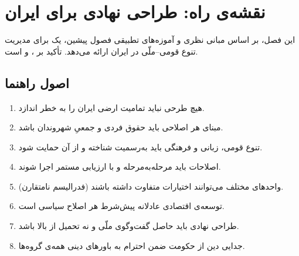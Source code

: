 
\chapter{نقشه‌ی راه: طراحی نهادی برای ایران}

\begin{keybox}
این فصل، بر اساس مبانی نظری و آموزه‌های تطبیقی فصول پیشین، یک  برای
مدیریت تنوع قومی–ملّی در ایران ارائه می‌دهد. تأکید بر ، 
و  است.
\end{keybox}

\section{اصول راهنما}

\begin{goldbox}
\begin{enumerate}[label=\textcolor{AccentGold}{\bfseries\Roman*.}]
  \item {}
    هیچ طرحی نباید تمامیت ارضی ایران را به خطر اندازد.
  \item {}
    مبنای هر اصلاحی باید حقوق فردی و جمعیِ شهروندان باشد.
  \item {}
    تنوع قومی، زبانی و فرهنگی باید به‌رسمیت شناخته و از آن حمایت شود.
  \item {}
    اصلاحات باید مرحله‌به‌مرحله و با ارزیابی مستمر اجرا شوند.
  \item {}
    واحدهای مختلف می‌توانند اختیارات متفاوت داشته باشند (فدرالیسم نامتقارن).
  \item {}
    توسعه‌ی اقتصادی عادلانه پیش‌شرط هر اصلاح سیاسی است.
  \item {}
    طراحی نهادی باید حاصل گفت‌وگوی ملّی و نه تحمیل از بالا باشد.
  \item {}
    جدایی دین از حکومت ضمن احترام به باورهای دینی همه‌ی گروه‌ها.
\end{enumerate}
\end{goldbox}

